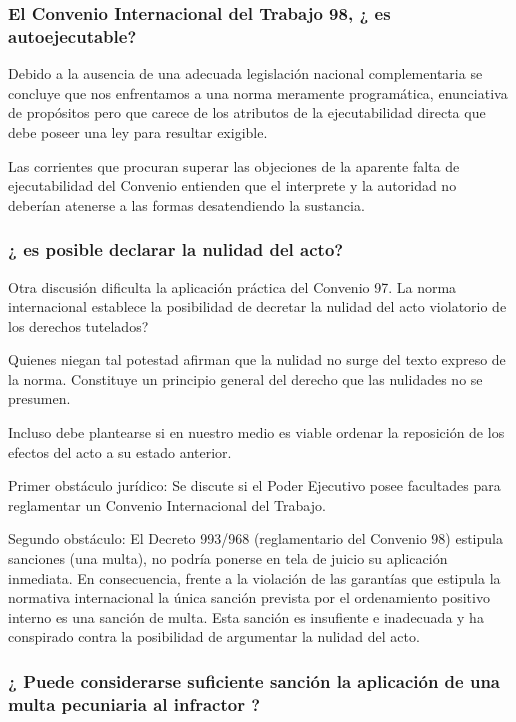 \documentclass[spanish,12pt,a4paper,titlepage]{report}
\begin{document}
\subsubsection{El Convenio Internacional del Trabajo 98, ¿ es autoejecutable?}

Debido a la ausencia de una adecuada legislación nacional complementaria se concluye que nos enfrentamos a una norma meramente programática, enunciativa de propósitos pero que carece de los atributos de la ejecutabilidad directa que debe poseer una ley para resultar exigible. 

Las corrientes que procuran superar las objeciones de la aparente falta de ejecutabilidad del Convenio entienden que el interprete y la autoridad no deberían atenerse a las formas desatendiendo la sustancia.
\subsubsection{¿ es posible declarar la nulidad del acto?}
Otra discusión dificulta la aplicación práctica del Convenio 97. La norma internacional establece la posibilidad de decretar la nulidad del acto violatorio de los derechos tutelados?

Quienes niegan tal potestad afirman que la nulidad no surge del texto expreso de la norma. Constituye un principio general del derecho que las nulidades no se presumen.

Incluso debe plantearse si en nuestro medio es viable ordenar la reposición de los efectos del acto a su estado anterior.

Primer obstáculo jurídico: Se discute si el Poder Ejecutivo posee facultades para reglamentar un Convenio Internacional del Trabajo.

Segundo obstáculo: El Decreto 993/968 (reglamentario del Convenio 98) estipula sanciones (una multa), no podría ponerse en tela de juicio su aplicación inmediata. En consecuencia, frente a la violación de las garantías que estipula la normativa internacional la única sanción prevista por el ordenamiento positivo interno es una sanción de multa. Esta sanción es insufiente e inadecuada y ha conspirado contra la posibilidad de argumentar la nulidad del acto.

\subsubsection{¿ Puede considerarse suficiente sanción la aplicación de una multa pecuniaria al infractor ?}
\end{document}
